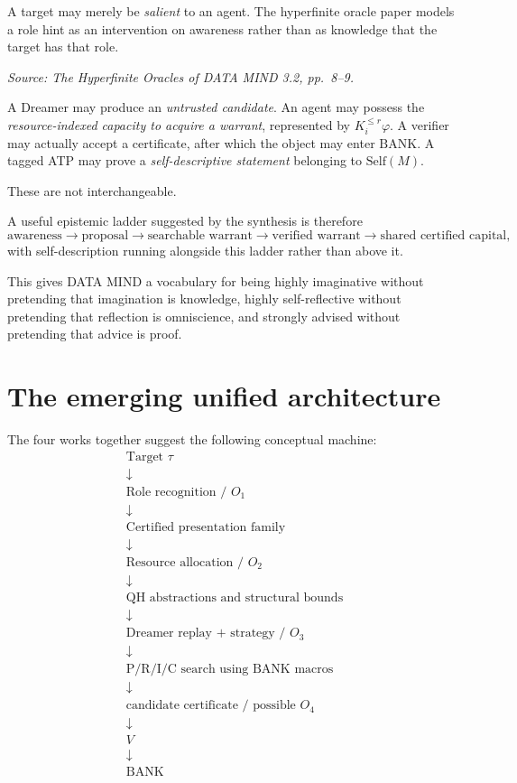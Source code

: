 \documentclass[11pt]{article}
\newcommand{\src}[1]{\par\smallskip\noindent\textit{Source: #1}\normalsize}
\newcommand{\BANK}{\ensuremath{\mathrm{BANK}}}
\begin{document}
A target may merely be \emph{salient} to an agent. The hyperfinite oracle paper models a role hint as an intervention on awareness rather than as knowledge that the target has that role.
\src{\emph{The Hyperfinite Oracles of DATA MIND 3.2}, pp.~8--9.}

A Dreamer may produce an \emph{untrusted candidate}. An agent may possess the \emph{resource-indexed capacity to acquire a warrant}, represented by $K_i^{\le r}\varphi$. A verifier may actually accept a certificate, after which the object may enter \BANK. A tagged ATP may prove a \emph{self-descriptive statement} belonging to $\mathrm{Self}(M)$.

These are not interchangeable.

A useful epistemic ladder suggested by the synthesis is therefore
\[
\text{awareness}
\rightarrow
\text{proposal}
\rightarrow
\text{searchable warrant}
\rightarrow
\text{verified warrant}
\rightarrow
\text{shared certified capital},
\]
with self-description running alongside this ladder rather than above it.

This gives DATA MIND a vocabulary for being highly imaginative without pretending that imagination is knowledge, highly self-reflective without pretending that reflection is omniscience, and strongly advised without pretending that advice is proof.

\section{The emerging unified architecture}

The four works together suggest the following conceptual machine:
\[
\boxed{
\begin{array}{c}
\text{Target }\tau\\
\downarrow\\
\text{Role recognition / }O_1\\
\downarrow\\
\text{Certified presentation family}\\
\downarrow\\
\text{Resource allocation / }O_2\\
\downarrow\\
\text{QH abstractions and structural bounds}\\
\downarrow\\
\text{Dreamer replay + strategy / }O_3\\
\downarrow\\
\text{P/R/I/C search using BANK macros}\\
\downarrow\\
\text{candidate certificate / possible }O_4\\
\downarrow\\
V\\
\downarrow\\
\BANK
\end{array}}
\]
\end{document}

